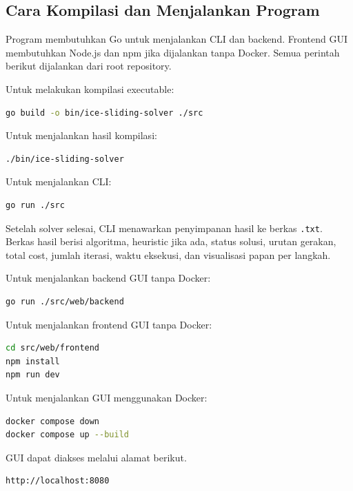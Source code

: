 \subsection{Cara Kompilasi dan Menjalankan Program}\label{sec:Cara Kompilasi dan Menjalankan Program}

Program membutuhkan Go untuk menjalankan CLI dan backend. Frontend
GUI membutuhkan Node.js dan npm jika dijalankan tanpa Docker. Semua
perintah berikut dijalankan dari root repository.

\noindent Untuk melakukan kompilasi executable:
\begin{lstlisting}[language=bash, basicstyle=\ttfamily\small, breaklines=true]
go build -o bin/ice-sliding-solver ./src
\end{lstlisting}

\noindent Untuk menjalankan hasil kompilasi:
\begin{lstlisting}[language=bash, basicstyle=\ttfamily\small, breaklines=true]
./bin/ice-sliding-solver
\end{lstlisting}

\noindent Untuk menjalankan CLI:
\begin{lstlisting}[language=bash, basicstyle=\ttfamily\small, breaklines=true]
go run ./src
\end{lstlisting}

Setelah solver selesai, CLI menawarkan penyimpanan hasil ke berkas
\texttt{.txt}. Berkas hasil berisi algoritma, heuristic jika ada,
status solusi, urutan gerakan, total cost, jumlah iterasi, waktu
eksekusi, dan visualisasi papan per langkah.

\noindent Untuk menjalankan backend GUI tanpa Docker:
\begin{lstlisting}[language=bash, basicstyle=\ttfamily\small, breaklines=true]
go run ./src/web/backend
\end{lstlisting}

\noindent Untuk menjalankan frontend GUI tanpa Docker:
\begin{lstlisting}[language=bash, basicstyle=\ttfamily\small, breaklines=true]
cd src/web/frontend
npm install
npm run dev
\end{lstlisting}

\noindent Untuk menjalankan GUI menggunakan Docker:
\begin{lstlisting}[language=bash, basicstyle=\ttfamily\small, breaklines=true]
docker compose down
docker compose up --build
\end{lstlisting}

\noindent GUI dapat diakses melalui alamat berikut.
\begin{lstlisting}[language=bash, basicstyle=\ttfamily\small, breaklines=true]
http://localhost:8080
\end{lstlisting}
